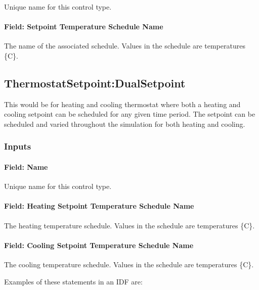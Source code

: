 Unique name for this control type.

\paragraph{Field: Setpoint Temperature Schedule Name}\label{field-setpoint-temperature-schedule-name-2}

The name of the associated schedule. Values in the schedule are temperatures \{C\}.

\subsection{ThermostatSetpoint:DualSetpoint}\label{thermostatsetpointdualsetpoint}

This would be for heating and cooling thermostat where both a heating and cooling setpoint can be scheduled for any given time period. The setpoint can be scheduled and varied throughout the simulation for both heating and cooling.

\subsubsection{Inputs}\label{inputs-4-039}

\paragraph{Field: Name}\label{field-name-4-034}

Unique name for this control type.

\paragraph{Field: Heating Setpoint Temperature Schedule Name}\label{field-heating-setpoint-temperature-schedule-name-000}

The heating temperature schedule. Values in the schedule are temperatures \{C\}.

\paragraph{Field: Cooling Setpoint Temperature Schedule Name}\label{field-cooling-setpoint-temperature-schedule-name}

The cooling temperature schedule. Values in the schedule are temperatures \{C\}.

Examples of these statements in an IDF are:

